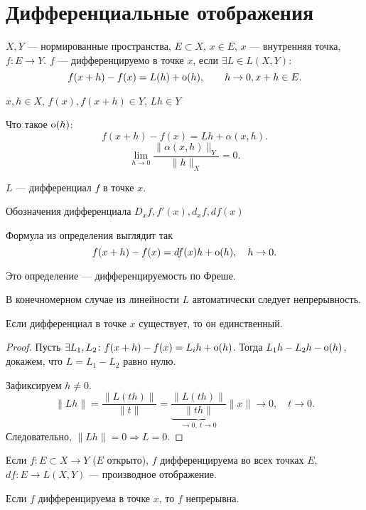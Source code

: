 \section{Дифференциальные отображения}
\begin{defn}
    $ X, Y$ --- нормированные пространства, $ E \subset X$, $ x \in E$, $ x$ --- внутренняя точка, $ f: E \to Y$.
    $ f$ --- {\sf дифференцируемо в точке  $ x$}, если $ \exists L \in L(X, Y) \colon $  
    \[
	f(x+h) - f(x) =L(h) + {\mathop{\text{\rm o}}}(h), \qquad h \to 0, x + h \in  E
    .\] 
\end{defn}
    \begin{note}
	$ x, h \in X$, $ f(x), f(x+h) \in Y$, $ Lh \in Y$

	Что такое $ {\mathop{\text{\rm o}}}(h)$:
	\[
	    f(x+h)-f(x) = Lh + \alpha (x, h)
	.\] 
	\[
	    \lim_{h \to  0} \frac{\| \alpha (x, h) \| _Y}{\| h \| _X} = 0
	.\] 
    \end{note}
\begin{defn}
    $ L$ --- {\sf дифференциал } $ f$ в точке $ x$.  
\end{defn}
    \begin{name}
	Обозначения дифференциала $ D_x f, f'(x), d_x f, df(x)$ 

	Формула из определения выглядит так
	\[
	    f(x+h) - f(x) = df(x) h + {\mathop{\text{\rm o}}}(h), \quad h \to 0
	.\] 
    \end{name}
\begin{note}
    Это определение --- дифференцируемость по Фреше.
\end{note}
\begin{note}
    В конечномерном случае из линейности $ L$ автоматически следует непрерывность.
\end{note}
\begin{thm}
    Если дифференциал в точке $ x$ существует, то он единственный.
\end{thm}
\begin{proof}
    Пусть $ \exists L_1,L_2 \colon f(x+h) - f(x) = L_ih + {\mathop{\text{\rm o}}}(h)$.
    Тогда $ L_1h - L_2h - {\mathop{\text{\rm o}}}(h)$, докажем, что $ L = L_1- L_2$ равно нулю.

    Зафиксируем $ h \ne 0$.
    \[
	\| Lh \|  = \frac{\| L(th) \| }{\| t \| } = \underbrace{\frac{\| L(th) \| }{\| th \|}}_{ \to  0, ~ t \to 0} \| x \|  \to  0, \quad t  \to 0
    .\] 
    Следовательно, $ \| Lh \|  = 0 \Longrightarrow L=0$.
\end{proof}
\begin{defn}
    Если $ f: E \subset X \to  Y$ ($ E$ открыто), $ f$ дифференцируема во всех точках $ E$, $ df: E \to  L(X, Y)$ --- {\sf производное отображение}.  
\end{defn}
\begin{note}
    Если $ f$ дифференцируема в точке $ x$, то  $ f$ непрерывна.
\end{note}
